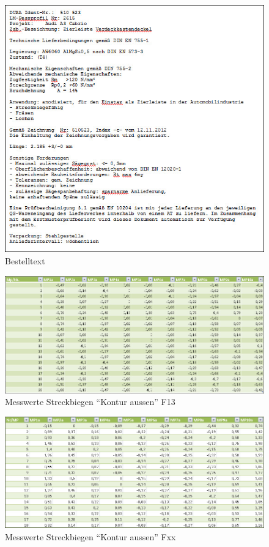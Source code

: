 \documentclass[12pt,a4paper,parskip]{scrartcl}
\begin{document}
\begin{figure}[hbtp]
\centering
\includegraphics[width=1\textwidth]{Bestelltext.jpg}
\caption{Bestelltext}
\end{figure}
\begin{figure}[hbtp]
\centering
\includegraphics[width=1\textwidth]{F13Bieg.jpg}
\caption{Messwerte Streckbiegen "`Kontur aussen"' F13}
\end{figure}
\begin{figure}[hbtp]
\centering
\includegraphics[width=1\textwidth]{FxxBieg.jpg}
\caption{Messwerte  Streckbiegen "`Kontur aussen"' Fxx}
\end{figure}
\end{document}
